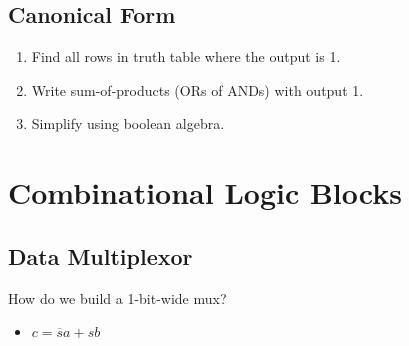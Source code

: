 \subsection{Canonical Form}
\begin{enumerate}
    \item Find all rows in truth table where the output is 1.
    \item Write sum-of-products (ORs of ANDs) with output 1.
    \item Simplify using boolean algebra.
\end{enumerate}

\section{Combinational Logic Blocks}

\subsection{Data Multiplexor}
How do we build a 1-bit-wide mux?
\begin{itemize}
    \item $c = \overline{s}a + sb$
\end{itemize}